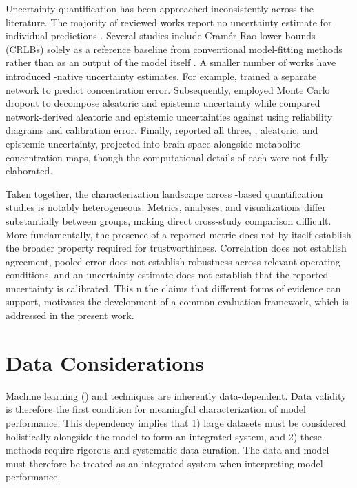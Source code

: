 Uncertainty quantification has been approached inconsistently across the literature. The majority of reviewed works report no uncertainty estimate for individual predictions \cite{Hatami2018, Chandler2019, Shamaei2020, Iqbal2021, Shamaei2021, Zhang2023, Wu2024}. Several studies include Cramér-Rao lower bounds (CRLBs) solely as a reference baseline from conventional model-fitting methods rather than as an output of the \DL model itself \cite{Rizzo2023, Dziadosz2023, Long2024}. A smaller number of works have introduced \DL-native uncertainty estimates. For example, \cite{Lee2020} trained a separate network to predict concentration error. Subsequently, \cite{Lee2022} employed Monte Carlo dropout to decompose aleatoric and epistemic uncertainty while \cite{Rizzo2022} compared network-derived aleatoric and epistemic uncertainties against \CRLBs using reliability diagrams and calibration error. Finally, \cite{Shamaei2025} reported all three, \CRLB, aleatoric, and epistemic uncertainty, projected into brain space alongside metabolite concentration maps, though the computational details of each were not fully elaborated.

Taken together, the characterization landscape across \DL-based \MRS quantification studies is notably heterogeneous. Metrics, analyses, and visualizations differ substantially between groups, making direct cross-study comparison difficult. More fundamentally, the presence of a reported metric does not by itself establish the broader property required for trustworthiness. Correlation does not establish agreement, pooled error does not establish robustness across relevant operating conditions, and an uncertainty estimate does not establish that the reported uncertainty is calibrated. This n the claims that different forms of evidence can support, motivates the development of a common evaluation framework, which is addressed in the present work.

\section{Data Considerations}
\label{sec:data model aggregate}
Machine learning (\ML) and \DL techniques are inherently data-dependent. Data validity is therefore the first condition for meaningful characterization of model performance. This dependency implies that 1) large datasets must be considered holistically alongside the \DL model to form an integrated system, and 2) these \AI methods require rigorous and systematic data curation. The data and \DL model must therefore be treated as an integrated system when interpreting model performance.

